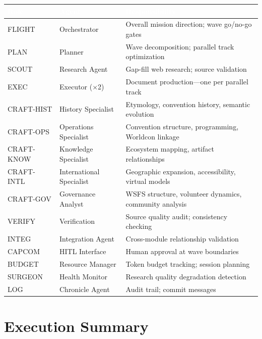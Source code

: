\documentclass[11pt,letterpaper]{article}
\newcommand{\tableheader}[1]{\textbf{\sffamily\textcolor{white}{#1}}}
\begin{document}
\begin{center}
\begin{tabularx}{\textwidth}{L{2cm}L{2.5cm}X}
\toprule
{}
\tableheader{Role} & \tableheader{Agent} & \tableheader{Responsibility} \\
\midrule
FLIGHT & Orchestrator & Overall mission direction; wave go/no-go gates \\
PLAN & Planner & Wave decomposition; parallel track optimization \\
SCOUT & Research Agent & Gap-fill web research; source validation \\
EXEC & Executor ($\times$2) & Document production---one per parallel track \\
CRAFT-HIST & History Specialist & Etymology, convention history, semantic evolution \\
CRAFT-OPS & Operations Specialist & Convention structure, programming, Worldcon linkage \\
CRAFT-KNOW & Knowledge Specialist & Ecosystem mapping, artifact relationships \\
CRAFT-INTL & International Specialist & Geographic expansion, accessibility, virtual models \\
CRAFT-GOV & Governance Analyst & WSFS structure, volunteer dynamics, community analysis \\
VERIFY & Verification & Source quality audit; consistency checking \\
INTEG & Integration Agent & Cross-module relationship validation \\
CAPCOM & HITL Interface & Human approval at wave boundaries \\
BUDGET & Resource Manager & Token budget tracking; session planning \\
SURGEON & Health Monitor & Research quality degradation detection \\
LOG & Chronicle Agent & Audit trail; commit messages \\
\bottomrule
\end{tabularx}
\end{center}

\section{Execution Summary}
\end{document}
